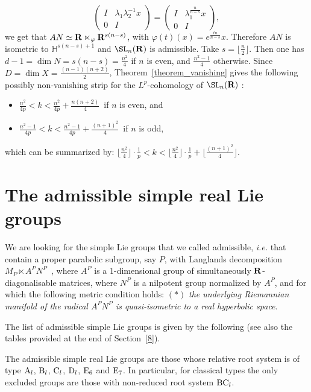 \begin{exam}
\[\begin{pmatrix}
I & \lambda_1 \lambda_2 ^{-1} x \\
0 & I
\end{pmatrix} =
\begin{pmatrix}
I & \lambda_1 ^{\frac{n}{n-s}}x \\
0 & I
\end{pmatrix},
\]
we get that $AN \simeq {\bf R} \ltimes _\varphi {\bf R} ^{s(n-s)}$, with $\varphi (t)(x) = e^{\frac{tn}{n-s}}x$. Therefore $AN$ is isometric to $\mathbb H ^{s(n-s)+1}$ and $\SL_n({\bf R})$ is admissible. Take $s = \lfloor \frac{n}{2} \rfloor$. Then one has $d-1 = \dim N = s(n-s) = \frac{n^2}{4}$ if $n$ is even, and $\frac{n^2-1}{4}$ otherwise. Since $D = \dim X = \frac{(n-1)(n+2)}{2}$, Theorem~\ref{theorem_vanishing} gives the following possibly non-vanishing strip for the $L^p$-cohomology of $\SL_n({\bf R})$ :
\begin{itemize}
\item $\frac{n^2}{4p} < k < \frac{n^2}{4p} + \frac{n(n+2)}{4}$~if $n$ is even, and
\item $\frac{n^2-1}{4p} < k < \frac{n^2-1}{4p} + \frac{(n+1)^2}{4}$~if $n$ is odd,
\end{itemize}
which can be summarized by: $\lfloor \frac{n^2}{4}\rfloor \cdot\frac{1}{p} <k<\lfloor \frac{n^2}{4}\rfloor \cdot\frac{1}{p} + \lfloor \frac{(n+1)^2}{4}\rfloor $.
\end{exam}



\section{The admissible simple real Lie groups}\label{7}

We are looking for the simple Lie groups that we called admissible, \emph{i.e.} that contain a proper parabolic subgroup, say $P$, with Langlands decomposition $M_P \ltimes A^PN^P$~\cite[Proposition~7.83]{Knapp}, where $A^P$ is a $1$-dimensional group of simultaneously ${\bf R}$-diagonalisable matrices, where $N^P$ is a nilpotent group normalized by $A^P$, and for which the following metric condition holds: $(*)$ \emph{the underlying Riemannian manifold of the radical $A^PN^P$ is quasi-isometric to a real hyperbolic space}.

The list of admissible simple Lie groups is given by the following (see also the tables provided at the end of Section~\ref{8}).

\begin{prop}
The admissible simple real Lie groups are those whose relative root system is of type ${\rm A}_l$, ${\rm B}_l$, ${\rm C}_l$, ${\rm D}_l$, ${\rm E}_6$ and ${\rm E}_7$. In particular, for classical types the only excluded groups are those with non-reduced root system ${\rm BC}_l$.
\end{prop}

